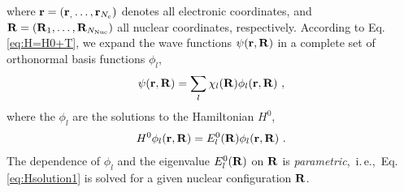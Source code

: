 where \mbox{${\bf r} = ({\bf r}_, \ldots, {\bf r}_{N_{\rm e}})$} denotes all electronic coordinates, and ${\bf R} = ({\bf R}_1, \ldots, {\bf R}_{N_{\rm Nuc}})$ all nuclear coordinates, respectively. According to Eq.\,\eqref{eq:H=H0+T}, we expand the wave functions $\psi ({\bf r}, {\bf R})$ in a complete set of orthonormal basis functions $\phi_l$,
\begin{align}
\psi ({\bf r}, {\bf R}) = \sum_l \chi_l ({\bf R}) \phi_l ({\bf r}, {\bf R})~,
\label{eq:psi_expansion_phi}
\end{align}
where the $\phi_l$ are the solutions to the Hamiltonian $H^0$,
\begin{align}
    H^0 \phi_l ({\bf r}, {\bf R})
        = E^0_l ({\bf R}) \phi_l ({\bf r}, {\bf R})~.
    \label{eq:Hsolution1}
\end{align}
The dependence of $\phi_l$ and the eigenvalue $E_l^0({\bf R})$ on $\bf R$ is \emph{parametric},~i.\,e.,~Eq.\,\eqref{eq:Hsolution1} is solved for a given nuclear configuration $\bf R$.

